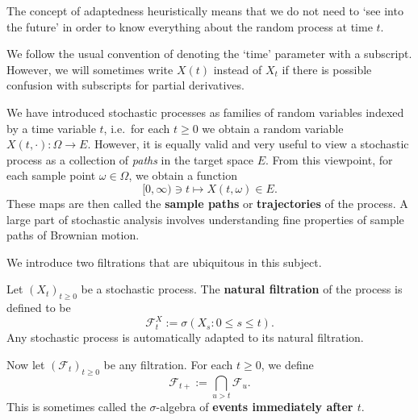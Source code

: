 The concept of adaptedness heuristically means that we do not need to `see into the future' in order to know everything about the random process at time $t$.

\begin{remark}[On notation]
    We follow the usual convention of denoting the `time' parameter with a subscript. However, we will sometimes write $X(t)$ instead of $X_t$ if there is possible confusion with subscripts for partial derivatives.
\end{remark}

We have introduced stochastic processes as families of random variables indexed by a time variable $t$, i.e.\ for each $t\ge 0$ we obtain a random variable $X(t,\cdot):\Omega\to E$. However, it is equally valid and very useful to view a stochastic process as a collection of \emph{paths} in the target space $E$. From this viewpoint, for each sample point $\omega\in\Omega$, we obtain a function
\begin{equation*}
    [0,\infty) \ni t\mapsto X(t,\omega)\in E.
\end{equation*}
These maps are then called the \textbf{sample paths} or \textbf{trajectories} of the process. A large part of stochastic analysis involves understanding fine properties of sample paths of Brownian motion.

We introduce two filtrations that are ubiquitous in this subject.
\begin{definition}
Let $(X_t)_{t \ge 0}$ be a stochastic process. The \textbf{natural filtration} of the process is defined to be
\begin{equation*}
    \mathcal{F}_t^X := \sigma(X_s : 0 \le s \le t).
\end{equation*}
Any stochastic process is automatically adapted to its natural filtration.

Now let $(\mathcal{F}_t)_{t\ge 0}$ be any filtration. For each $t\ge 0$, we define
\begin{equation*}
    \mathcal{F}_{t+} := \bigcap_{u > t} \mathcal{F}_u.
\end{equation*}
This is sometimes called the $\sigma$-algebra of \textbf{events immediately after $t$}.
\end{definition}

